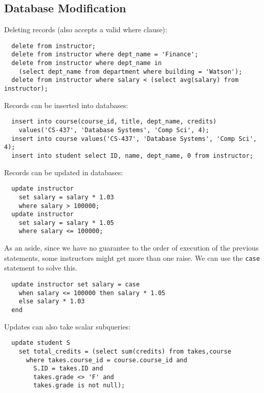 \documentclass{math}
\begin{document}
\subsection*{Database Modification}
Deleting records (also accepts a valid where clause):
\begin{lstlisting}
  delete from instructor;
  delete from instructor where dept_name = 'Finance';
  delete from instructor where dept_name in
    (select dept_name from department where building = 'Watson');
  delete from instructor where salary < (select avg(salary) from instructor);
\end{lstlisting}
Records can be inserted into databases:
\begin{lstlisting}
  insert into course(course_id, title, dept_name, credits)
    values('CS-437', 'Database Systems', 'Comp Sci', 4);
  insert into course values('CS-437', 'Database Systems', 'Comp Sci', 4);
  insert into student select ID, name, dept_name, 0 from instructor;
\end{lstlisting}
Records can be updated in databases:
\begin{lstlisting}
  update instructor
    set salary = salary * 1.03
    where salary > 100000;
  update instructor
    set salary = salary * 1.05
    where salary <= 100000;
\end{lstlisting}
As an aside, since we have no guarantee to the order of execution of the
previous statements, some instructors might get more than one raise. We can
use the \texttt{case} statement to solve this.
\begin{lstlisting}
  update instructor set salary = case
    when salary <= 100000 then salary * 1.05
    else salary * 1.03
  end
\end{lstlisting}
Updates can also take scalar subqueries:
\begin{lstlisting}
  update student S
    set total_credits = (select sum(credits) from takes,course
      where takes.course_id = course.course_id and
        S.ID = takes.ID and
        takes.grade <> 'F' and
        takes.grade is not null);
\end{lstlisting}
\end{document}
